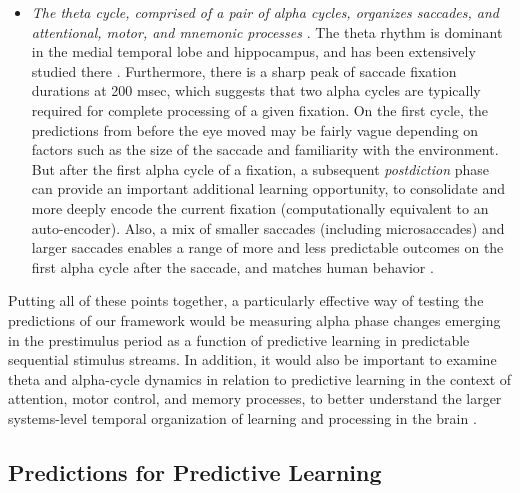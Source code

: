 \documentclass[11pt,twoside]{article}
\newif\myifpdf
\begin{document}
\begin{itemize}
	\item \emph{The theta cycle, comprised of a pair of alpha cycles, organizes saccades, and attentional, motor, and mnemonic processes} \citep{FiebelkornKastner19}.  The theta rhythm is dominant in the medial temporal lobe and hippocampus, and has been extensively studied there \citep{KahanaSeeligMadsen01,Buzsaki05}.  Furthermore, there is a  sharp peak of saccade fixation durations at 200 msec, which suggests that two alpha cycles are typically required for  complete processing of a given fixation.  On the first cycle, the predictions from before the eye moved may be fairly vague depending on factors such as the size of the saccade and familiarity with the environment.  But after the first alpha cycle of a fixation, a subsequent \emph{postdiction} phase can provide an important additional learning opportunity, to consolidate and more deeply encode the current fixation (computationally equivalent to an auto-encoder).  Also, a mix of smaller saccades (including microsaccades) and larger saccades enables a range of more and less predictable outcomes on the first alpha cycle after the saccade, and matches human behavior \citep{Martinez-CondeOtero-MillanMacknik13,Martinez-CondeMacknikHubel04}.

\end{itemize}

Putting all of these points together, a particularly effective way of testing the predictions of our framework would be measuring alpha phase changes emerging in the prestimulus period as a function of predictive learning in predictable sequential stimulus streams.  In addition, it would also be important to examine theta and alpha-cycle dynamics in relation to predictive learning in the context of attention, motor control, and memory processes, to better understand the larger systems-level temporal organization of learning and processing in the brain \citep{FiebelkornKastner19}.

\subsection{Predictions for Predictive Learning}
\end{document}
